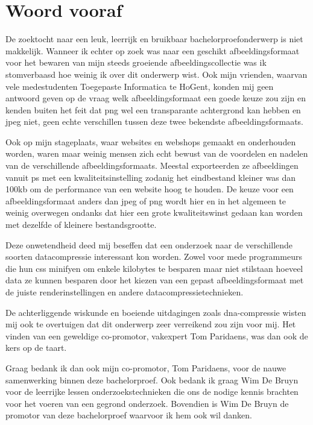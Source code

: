 
\chapter*{Woord vooraf}
\label{ch:voorwoord}

De zoektocht naar een leuk, leerrijk en bruikbaar bachelorproefonderwerp is niet makkelijk. Wanneer ik echter op zoek was naar een geschikt \gls{afbeeldingsformaat} voor het bewaren van mijn steeds groeiende afbeeldingscollectie was ik stomverbaasd hoe weinig ik over dit onderwerp wist. Ook mijn vrienden, waarvan vele medestudenten Toegepaste Informatica te HoGent, konden mij geen antwoord geven op de vraag welk \gls{afbeeldingsformaat} een goede keuze zou zijn en kenden buiten het feit dat \gls{png} wel een transparante achtergrond kan hebben en \gls{jpeg} niet, geen echte verschillen tussen deze twee bekendste \glspl{afbeeldingsformaat}.

Ook op mijn stageplaats, waar websites en webshops gemaakt en onderhouden worden, waren maar weinig mensen zich echt bewust van de voordelen en nadelen van de verschillende \glspl{afbeeldingsformaat}. Meestal exporteerden ze afbeeldingen vanuit \gls{ps} met een kwaliteitsinstelling zodanig het eindbestand kleiner was dan 100kb om de performance van een website hoog te houden. De keuze voor een \gls{afbeeldingsformaat} anders dan \gls{jpeg} of \gls{png} wordt hier en in het algemeen te weinig overwegen ondanks dat hier een grote kwaliteitswinst gedaan kan worden met dezelfde of kleinere bestandsgrootte. 

Deze onwetendheid deed mij beseffen dat een onderzoek naar de verschillende soorten \gls{datacompressie} interessant kon worden. Zowel voor mede programmeurs die hun \gls{css} \gls{minifyen} om enkele kilobytes te besparen maar niet stilstaan hoeveel data ze kunnen besparen door het kiezen van een gepast \gls{afbeeldingsformaat} met de juiste \gls{render}instellingen en andere \gls{datacompressie}technieken. 

De achterliggende wiskunde en boeiende uitdagingen zoals \gls{dna-compressie} wisten mij ook te overtuigen dat dit onderwerp zeer verreikend zou zijn voor mij. Het vinden van een geweldige co-promotor, vakexpert Tom Paridaens, was dan ook de kers op de taart.

\pagebreak

Graag bedank ik dan ook mijn co-promotor, Tom Paridaens, voor de nauwe samenwerking binnen deze bachelorproef. Ook bedank ik graag Wim De Bruyn voor de leerrijke lessen onderzoekstechnieken die ons de nodige kennis brachten voor het voeren van een gegrond onderzoek. Bovendien is Wim De Bruyn de promotor van deze bachelorproef waarvoor ik hem ook wil danken.

